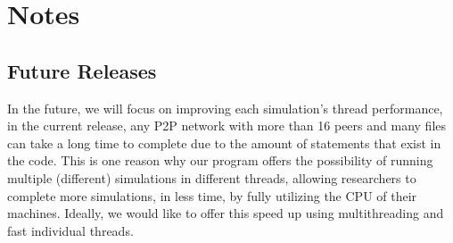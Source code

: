 \documentclass[letterpaper,10pt,english]{sphinxmanual}
\begin{document}

\begin{fulllineitems}
\label{\detokenize{app:app.type_hints.NodeDict}}
\end{fulllineitems}


\begin{fulllineitems}
\label{\detokenize{app:app.type_hints.NodeType}}
\end{fulllineitems}


\begin{fulllineitems}
\label{\detokenize{app:app.type_hints.ReplicasDict}}
\end{fulllineitems}



\chapter{Notes}
\label{\detokenize{notedocs:notes}}\label{\detokenize{notedocs::doc}}

\section{Future Releases}
\label{\detokenize{notedocs:future-releases}}
In the future, we will focus on improving each simulation’s thread performance,
in the current release, any P2P network with more than 16 peers and many files
can take a long time to complete due to the amount of  statements that
exist in the code. This is one reason why our program offers the possibility
of running multiple (different) simulations in different threads, allowing
researchers to complete more simulations, in less time, by fully utilizing the
CPU of their machines. Ideally, we would like to offer this speed up using
multi\sphinxhyphen{}threading and fast individual threads.
\end{document}
